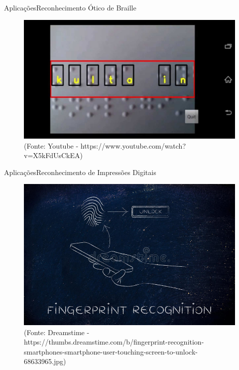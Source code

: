 \begin{frame}{Aplicações}{Reconhecimento Ótico de Braille}

\begin{figure}
    \centering
    \includegraphics[scale=.2]{img/obr.jpg}
    \\ (Fonte: Youtube - https://www.youtube.com/watch?v=X5kFdUsCkEA)
    \label{fig:optical_braille_recognition}
\end{figure}

\end{frame}

\begin{frame}{Aplicações}{Reconhecimento de Impressões Digitais}

\begin{figure}

    \centering
    \includegraphics[scale=1]{img/fingerprint_recognition.jpg}
    \\ (Fonte: Dreamstime - https://thumbs.dreamstime.com/b/fingerprint-recognition-smartphones-smartphone-user-touching-screen-to-unlock-68633965.jpg)
    \label{fig:fingerprint_recognition}
\end{figure}

\end{frame} 

